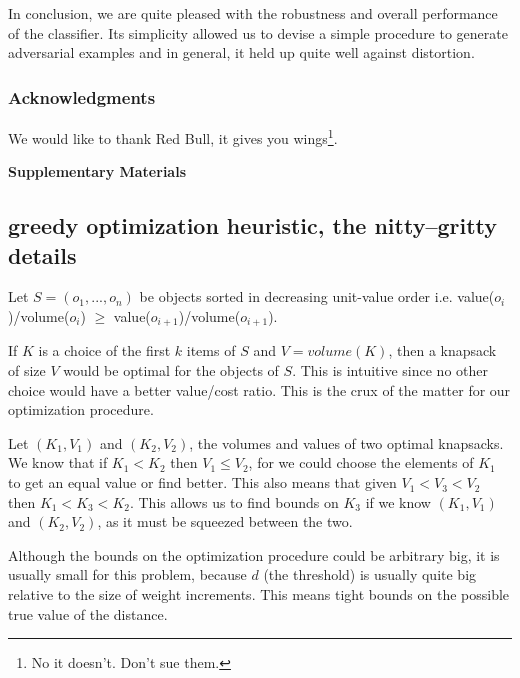 \documentclass{article} %
\begin{document}
In conclusion, we are quite pleased with the robustness and overall performance of the classifier. Its simplicity allowed us to devise a simple procedure to generate adversarial examples and in general, it held up quite well against distortion. 



\subsubsection*{Acknowledgments}
We would like to thank Red Bull, it gives you wings\footnote{No it doesn't. Don't sue them.}.







\newpage


\begin{center}
\textbf{\large Supplementary Materials}
\end{center}

\subsection{greedy optimization heuristic, the nitty–gritty details}
\label{greedy:proof}

Let $S = (o_1 , ..., o_n)$ be objects sorted in decreasing unit-value order i.e. value($o_i$)/volume($o_i$) $\geq$  value($o_{i+1}$)/volume($o_{i+1}$).

If $K$ is a choice of the first $k$ items of $S$ and $V=volume(K)$, then a knapsack of size $V$ would be optimal for the objects of $S$. This is intuitive since no other choice would have a better value/cost ratio. This is the crux of the matter for our optimization procedure.


Let $(K_1, V_1)$ and $(K_2, V_2)$, the volumes and values of two optimal knapsacks. We know that if $K_1 < K_2$ then $V_1 \leq V_2$, for we could choose the elements of $K_1$ to get an equal value or find better. This also means that given $V_1 < V_3 < V_2$ then $K_1 < K_3 < K_2$. This allows us to find bounds on $K_3$ if we know $(K_1, V_1)$ and $(K_2, V_2)$, as it must be squeezed between the two.

Although the bounds on the optimization procedure could be arbitrary big, it
is usually small for this problem, because $d$ (the threshold) is usually quite big relative
to the size of weight increments. This means tight bounds on the possible
true value of the distance.
\end{document}
